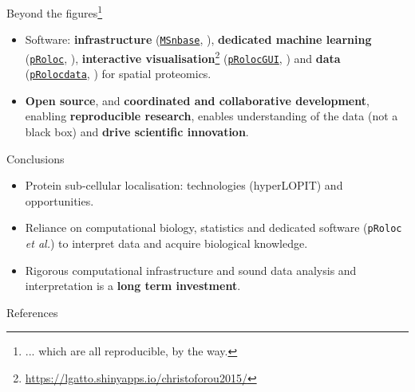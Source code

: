 \documentclass[presentation]{beamer}
\begin{document}
\begin{frame}{}

  Beyond the figures\footnote{... which are all reproducible, by the way.}

  \begin{itemize}
  \item Software: \textbf{infrastructure}
    (\href{http://bioconductor.org/packages/MSnbase}{\texttt{MSnbase}},
    \cite{Gatto:2012}), \textbf{dedicated machine learning}
    (\href{http://bioconductor.org/packages/pRoloc}{\texttt{pRoloc}},
    \cite{Gatto:2014a}), \textbf{interactive
      visualisation}\footnote{\url{https://lgatto.shinyapps.io/christoforou2015/}}
    (\href{http://bioconductor.org/packages/pRolocGUI}{\texttt{pRolocGUI}},
    \cite{pRolocGUI}) and \textbf{data}
    (\href{http://bioconductor.org/packages/pRolocdata}{\texttt{pRolocdata}},
    \cite{Gatto:2014a}) for spatial proteomics.
  \item \textbf{Open source}, and \textbf{coordinated and
    collaborative development}, enabling \textbf{reproducible
    research}, enables understanding of the data (not a black box) and
    \textbf{drive scientific innovation}.
  \end{itemize}
\end{frame}



\begin{frame}[fragile]{Conclusions}
  \begin{itemize}
  \item Protein sub-cellular localisation: technologies (hyperLOPIT)
    and opportunities.

  \item Reliance on computational biology, statistics and dedicated
    software (\texttt{pRoloc} \textit{et al.}) to interpret data and
    acquire biological knowledge.

  \item Rigorous computational infrastructure and sound data analysis
    and interpretation is a \textbf{long term investment}.

  \end{itemize}

\end{frame}


\begin{frame}[allowframebreaks]{References}
  \tiny
  
  
\end{frame}
\end{document}
